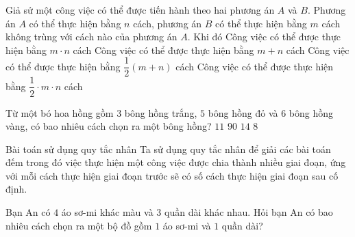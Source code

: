 \begin{ex}%
	Giả sử một công việc có thể được tiến hành theo hai phương án $A$ và $B$. Phương án $A$ có thể thực hiện bằng $n$ cách, phương án $B$ có thể thực hiện bằng $m$ cách không trùng với cách nào của phương án $A$. Khi đó
	\choice
	{Công việc có thể được thực hiện bằng $m\cdot n$ cách}
	{\True Công việc có thể được thực hiện bằng $m+n$ cách}
	{Công việc có thể được thực hiện bằng $\dfrac{1}{2}(m+n)$ cách}
	{Công việc có thể được thực hiện bằng $\dfrac{1}{2}\cdot m\cdot n$ cách}
\end{ex}


\begin{ex}%
	Từ một bó hoa hồng gồm $3$ bông hồng trắng, $5$ bông hồng đỏ và $6$ bông hồng vàng, có bao nhiêu cách chọn ra một bông hồng?
	\choice
	{$11$}
	{$90$}
	{\True $14$}
	{$8$}
\end{ex}

\begin{dang}{Bài toán sử dụng quy tắc nhân}
	Ta sử dụng quy tắc nhân để giải các bài toán đếm trong đó việc thực hiện một công việc được chia thành nhiều giai đoạn, ứng với mỗi cách thực hiện giai đoạn trước sẽ có số cách thực hiện giai đoạn sau cố định.
\end{dang}
\viduminhhoa
\begin{vd}%
	Bạn An có $4$ áo sơ-mi khác màu và $3$ quần dài khác nhau. Hỏi bạn An có bao nhiêu cách chọn ra một bộ đồ gồm $1$ áo sơ-mi và $1$ quần dài?
\end{vd}

